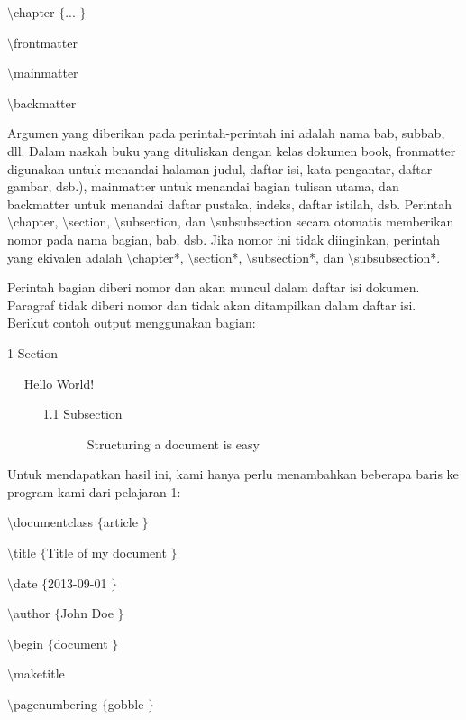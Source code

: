 {\fontsize{10pt}{10pt}\selectfont  $  \setminus  $chapter $  \{  $... $  \}  $}
 \par
\vspace{9pt}
{\fontsize{10pt}{10pt}\selectfont  $  \setminus  $frontmatter}
 \par
\vspace{9pt}
{\fontsize{10pt}{10pt}\selectfont  $  \setminus  $mainmatter}
 \par
\vspace{9pt}
{\fontsize{10pt}{10pt}\selectfont  $  \setminus  $backmatter}
 \par
\vspace{10pt}
\vspace{12pt}
Argumen yang diberikan pada perintah-perintah ini adalah nama bab, subbab, dll. Dalam naskah buku yang dituliskan dengan kelas dokumen book, fronmatter digunakan untuk menandai halaman judul, daftar isi, kata pengantar, daftar gambar, dsb.), mainmatter untuk menandai bagian tulisan utama, dan backmatter untuk menandai daftar pustaka, indeks, daftar istilah, dsb. Perintah  $  \setminus  $chapter,  $  \setminus  $section,  $  \setminus  $subsection, dan  $  \setminus  $subsubsection secara otomatis memberikan nomor pada nama bagian, bab, dsb. Jika nomor ini tidak diinginkan, perintah yang ekivalen adalah  $  \setminus  $chapter*,  $  \setminus  $section*,  $  \setminus  $subsection*, dan  $  \setminus  $subsubsection*.
 \par
\vspace{12pt}
Perintah bagian diberi nomor dan akan muncul dalam daftar isi dokumen. Paragraf tidak diberi nomor dan tidak akan ditampilkan dalam daftar isi. Berikut contoh output menggunakan bagian:
 \par
1 Section
 \par
~~ Hello World!
 \par
~~~~~ 1.1 Subsection
 \par
~~~~~~~~~~~~ Structuring a document is easy
 \par
\vspace{12pt}
Untuk mendapatkan hasil ini, kami hanya perlu menambahkan beberapa baris ke program kami dari pelajaran 1:
 \par
 $  \setminus  $documentclass $  \{  $article $  \}  $
 \par
\vspace{12pt}
 $  \setminus  $title $  \{  $Title of my document $  \}  $
 \par
 $  \setminus  $date $  \{  $2013-09-01 $  \}  $
 \par
 $  \setminus  $author $  \{  $John Doe $  \}  $
 \par
\vspace{12pt}
 $  \setminus  $begin $  \{  $document $  \}  $
 \par
\vspace{12pt}
 $  \setminus  $maketitle
 \par
 $  \setminus  $pagenumbering $  \{  $gobble $  \}  $
 \par

